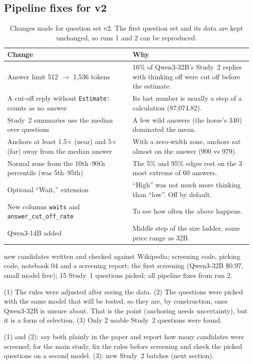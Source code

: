\documentclass[11pt,a4paper]{article}
\newcommand{\dpn}[3]{%
\begin{tcolorbox}[breakable, colback=white, colframe=trline, boxrule=0.4pt, arc=0pt, left=6pt, right=6pt, top=4pt, bottom=4pt, before skip=10pt, after skip=10pt]
\small
\noindent{\color{donecol}\textsf{\textbf{DONE}}}\quad #1\par\medskip
\noindent{\color{probcol}\textsf{\textbf{PROBLEM}}}\quad #2\par\medskip
\noindent{\color{nextcol}\textsf{\textbf{WHAT WE DID / DO NEXT}}}\quad #3
\end{tcolorbox}}
\begin{document}
\subsection{Pipeline fixes for v2}

\begin{table}[ht]
\centering\small
\begin{tabularx}{\textwidth}{@{}P{5.6cm}L@{}}
\toprule
\textbf{Change} & \textbf{Why} \\
\midrule
Answer limit 512 $\to$ 1,536 tokens & 16\% of Qwen3-32B's Study~2 replies with thinking off were cut off before the estimate. \\
A cut-off reply without \texttt{Estimate:} counts as no answer & Its last number is usually a step of a calculation (87,074.82). \\
Study~2 summaries use the median over questions & A few wild answers (the horse's 340) dominated the mean. \\
Anchors at least 1.5$\times$ (near) and 5$\times$ (far) away from the median answer & With a zero-width zone, anchors sat almost on the answer (900 vs 979). \\
Normal zone from the 10th--90th percentile (was 5th--95th) & The 5\% and 95\% edges rest on the 3 most extreme of 60 answers. \\
Optional ``Wait,'' extension & ``High'' was not much more thinking than ``low''. Off by default. \\
New columns \texttt{waits} and \texttt{answer\_cut\_off\_rate} & To see how often the above happens. \\
Qwen3-14B added & Middle step of the size ladder, same price range as 32B. \\
\bottomrule
\end{tabularx}
\caption{Changes made for question set v2. The first question set and its data are kept unchanged, so runs 1 and 2 can be reproduced.}
\end{table}

\dpn{206 new candidates written and checked against Wikipedia; screening code, picking code, notebook 04 and a screening report; the first screening (Qwen3-32B \$0.97, small model free); 15 Study~1 questions picked; all pipeline fixes from run 2.}
{(1) The rules were adjusted after seeing the data. (2) The questions were picked with the same model that will be tested, so they are, by construction, ones Qwen3-32B is unsure about. That is the point (anchoring needs uncertainty), but it is a form of selection. (3) Only 2 usable Study~2 questions were found.}
{(1) and (2): say both plainly in the paper and report how many candidates were screened; for the main study, fix the rules before screening and check the picked questions on a second model. (3): new Study~2 batches (next section).}
\end{document}
